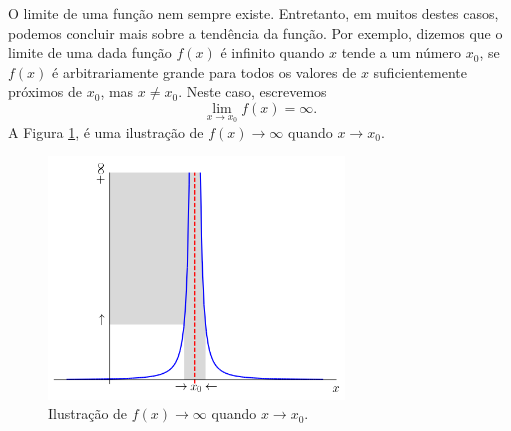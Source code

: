 O limite de uma função nem sempre existe. Entretanto, em muitos destes casos, podemos concluir mais sobre a tendência da função. Por exemplo, dizemos que o limite de uma dada função $f(x)$ é infinito quando $x$ tende a um número $x_0$, se $f(x)$ é arbitrariamente grande para todos os valores de $x$ suficientemente próximos de $x_0$, mas $x\neq x_0$. Neste caso, escrevemos
\begin{equation}
  \lim_{x\to x_0} f(x) = \infty.
\end{equation}
A Figura \ref{fig:liminf}, é uma ilustração de $f(x)\to\infty$ quando $x\to x_0$.

\begin{figure}[H]
  \centering
  \includegraphics[width=0.7\textwidth]{./cap_lim/dados/fig_liminf/fig}
  \caption{Ilustração de $f(x)\to\infty$ quando $x\to x_0$.}
  \label{fig:liminf}
\end{figure}



